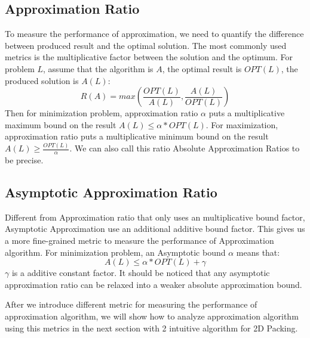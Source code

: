 \documentclass[sigplan,screen,nonacm]{acmart}\settopmatter{printfolios=true,printccs=false,printacmref=false}
\begin{document}
\subsection{Approximation Ratio}
To measure the performance of approximation, we need to quantify the difference between produced result and the optimal solution. The most commonly used metrics is the multiplicative factor between the solution and the optimum. For problem $L$, assume that the algorithm is $A$, the optimal result is $OPT(L)$, the produced solution is $A(L)$:
$$R(A) = max(\frac{OPT(L)}{A(L)}, \frac{A(L)}{OPT(L)})$$
Then for minimization problem, approximation ratio $\alpha$ puts a multiplicative maximum bound on the result $A(L) \leq \alpha*OPT(L)$. For maximization, approximation ratio puts a multiplicative minimum bound on the result $A(L) \geq \frac{OPT(L)}{\alpha}$. We can also call this ratio Absolute Approximation Ratios to be precise.
\subsection{Asymptotic Approximation Ratio}
Different from Approximation ratio that only uses an multiplicative bound factor, Asymptotic Approximation use an additional additive bound factor. This gives us a more fine-grained metric to measure the performance of Approximation algorithm. For minimization problem, an Asymptotic bound $\alpha$ means that:
$$ A(L) \leq \alpha*OPT(L) + \gamma $$
$\gamma$ is a additive constant factor. It should be noticed that any asymptotic approximation ratio can be relaxed into a weaker absolute approximation bound.\par
After we introduce different metric for measuring the performance of approximation algorithm, we will show how to analyze approximation algorithm using this metrics in the next section with 2 intuitive algorithm for 2D Packing.
\end{document}
